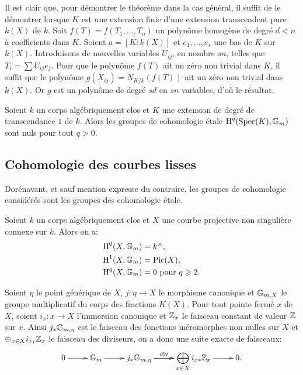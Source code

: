 \documentclass[oneside]{book}
\begin{document}
Il est clair que, pour démontrer le théorème dans la cas général, il 
suffit de le démontrer lorsque $K$ est une extension finie d'une extension 
transcendent pure $k(X)$ de $k$. Soit $f(T)=f(T_1,\dotsc,T_n)$ un 
polynôme homogène de degré $d<n$ à coefficients dans $K$. Soient 
$a=[K:k(X)]$ et $e_1,\dotsc,e_s$ une bas de $K$ sur $k(X)$. Introduisons de 
nouvelles variables $U_{i j}$, en nombre $s n$, telles que 
$T_i=\sum U_{i j}e_j$. Pour que le polynôme $f(T)$ ait un zéro 
non trivial dans $K$, il suffit que le polynôme 
$g(X_{i j}) = N_{K/k}(f( T))$ ait un zéro non trivial dans $k(X)$. 
Or $g$ est un polynôme de degré $s d$ en $s n$ variables, d'où le 
résultat. 





\begin{corollary}\label{I:3-2-4}
  Soient $k$ un corps algébriquement clos et $K$ une extension de degré 
de transcendance $1$ de $k$. Alors les groupes de cohomologie étale 
$\operatorname{H}^q(\operatorname{Spec}(K),\mathbb{G}_m)$ sont nuls pour tout $q>0$. 
\end{corollary}










\subsection{Cohomologie des courbes lisses}

Dorénavant, et sauf mention expresse du contraire, les groupes de 
cohomologie considérés sont les groupes des cohomologie étale. 





\begin{proposition}\label{I:3-3-1}
Soient $k$ un corps algébriquement clos et $X$ une courbe projective non 
singulière connexe sur $k$. Alors on a:
\begin{align*}
  \operatorname{H}^0(X,\mathbb{G}_m) &= k^\times \text{,} \\
  \operatorname{H}^1(X,\mathbb{G}_m) &= \operatorname{Pic}(X) \text{,} \\
  \operatorname{H}^q(X,\mathbb{G}_m) &= 0 \text{ pour $q\geqslant 2$.}
\end{align*}
\end{proposition}

Soient $\eta$ le point générique de $X$, $j:\eta\to X$ le morphisme 
canonique et $\mathbb{G}_{m,X}$ le groupe multiplicatif du corps des fractions 
$K(X)$. Pour tout pointe fermé $x$ de $X$, soient $i_x:x\to X$ l'immersion 
canonique et $\mathbb{Z}_x$ le faisceau constant de valeur $\mathbb{Z}$ sur $x$. Ainsi 
$j_*\mathbb{G}_{m,\eta}$ est le faisceau des fonctions méromorphes non nulles sur 
$X$ et $\oplus_{x\in X} i_{x_I}\mathbb{Z}_x$ le faisceau des diviseurs, on a donc une 
suite exacte de faisceaux:
\begin{equation}\label{I:eq:2}
\xymatrix{
  0 \ar[r] 
    & \dG_m \ar[r]
    & j_* \dG_{m,\eta} \ar[r]^-{\dv} \ar[r] 
    & \displaystyle\bigoplus_{x\in X} i_{x*} \dZ_x \ar[r] 
    & 0\text{.}
}
\end{equation}
\end{document}

